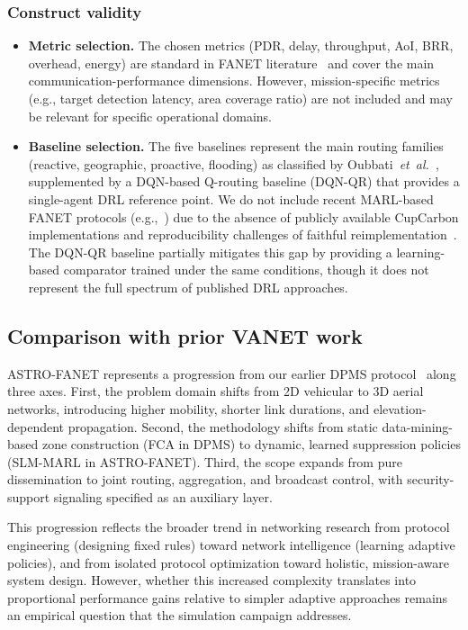 \documentclass[5p,times]{elsarticle}
\begin{document}
\subsubsection{Construct validity}

\begin{itemize}
\item \textbf{Metric selection.} The chosen metrics (PDR, delay, throughput, AoI, BRR, overhead, energy) are standard in FANET literature~\cite{bekmezci2013fanets,khan2020routing} and cover the main communication-performance dimensions. However, mission-specific metrics (e.g., target detection latency, area coverage ratio) are not included and may be relevant for specific operational domains.

\item \textbf{Baseline selection.} The five baselines represent the main routing families (reactive, geographic, proactive, flooding) as classified by Oubbati~\textit{et~al.}~\cite{oubbati2019routing}, supplemented by a DQN-based Q-routing baseline (DQN-QR) that provides a single-agent DRL reference point. We do not include recent MARL-based FANET protocols (e.g.,~\cite{zhao2024marl_uav}) due to the absence of publicly available CupCarbon implementations and reproducibility challenges of faithful reimplementation~\cite{henderson2018deep_rl_matters}. The DQN-QR baseline partially mitigates this gap by providing a learning-based comparator trained under the same conditions, though it does not represent the full spectrum of published DRL approaches.
\end{itemize}

\subsection{Comparison with prior VANET work}

ASTRO-FANET represents a progression from our earlier DPMS protocol~\cite{allani2018dpms} along three axes. First, the problem domain shifts from 2D vehicular to 3D aerial networks, introducing higher mobility, shorter link durations, and elevation-dependent propagation. Second, the methodology shifts from static data-mining-based zone construction (FCA in DPMS) to dynamic, learned suppression policies (SLM-MARL in ASTRO-FANET). Third, the scope expands from pure dissemination to joint routing, aggregation, and broadcast control, with security-support signaling specified as an auxiliary layer.

This progression reflects the broader trend in networking research from protocol engineering (designing fixed rules) toward network intelligence (learning adaptive policies), and from isolated protocol optimization toward holistic, mission-aware system design. However, whether this increased complexity translates into proportional performance gains relative to simpler adaptive approaches remains an empirical question that the simulation campaign addresses.
\end{document}
